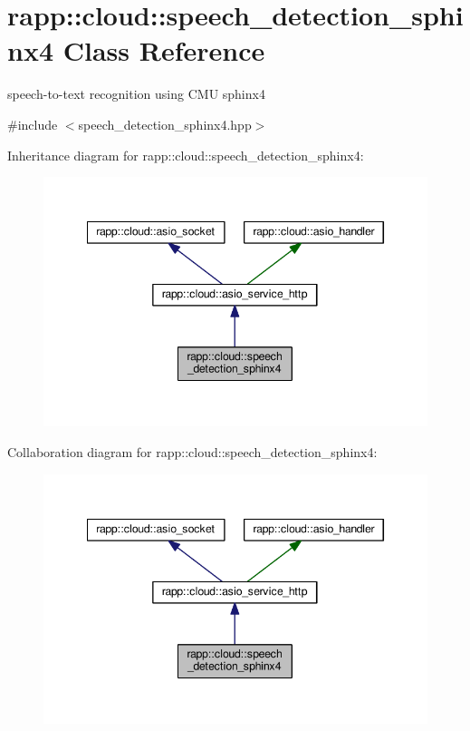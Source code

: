 \hypertarget{classrapp_1_1cloud_1_1speech__detection__sphinx4}{\section{rapp\-:\-:cloud\-:\-:speech\-\_\-detection\-\_\-sphinx4 Class Reference}
\label{classrapp_1_1cloud_1_1speech__detection__sphinx4}
}


speech-\/to-\/text recognition using C\-M\-U sphinx4  




{\ttfamily \#include $<$speech\-\_\-detection\-\_\-sphinx4.\-hpp$>$}



Inheritance diagram for rapp\-:\-:cloud\-:\-:speech\-\_\-detection\-\_\-sphinx4\-:
\nopagebreak
\begin{figure}[H]
\begin{center}
\leavevmode
\includegraphics[width=345pt]{classrapp_1_1cloud_1_1speech__detection__sphinx4__inherit__graph}
\end{center}
\end{figure}


Collaboration diagram for rapp\-:\-:cloud\-:\-:speech\-\_\-detection\-\_\-sphinx4\-:
\nopagebreak
\begin{figure}[H]
\begin{center}
\leavevmode
\includegraphics[width=345pt]{classrapp_1_1cloud_1_1speech__detection__sphinx4__coll__graph}
\end{center}
\end{figure}
